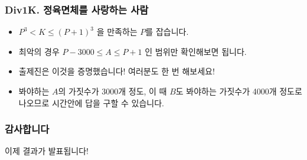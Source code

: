 \documentclass[xetex]{beamer}
\begin{document}
\begin{frame}
  \frametitle{Div1K. 정육면체를 사랑하는 사람}
  \begin{itemize}
    \item $P^3 < K \le (P+1)^3$  을 만족하는 $P$를 잡습니다.
    \item 최악의 경우 $P - 3000 \le A \le P+1$ 인 범위만 확인해보면 됩니다.
    \item 출제진은 이것을 증명했습니다! 여러분도 한 번 해보세요!
    \item 봐야하는 $A$의 가짓수가 3000개 정도, 이 때 $B$도 봐야하는 가짓수가 4000개 정도로 나오므로 시간안에 답을 구할 수 있습니다.
  \end{itemize}
\end{frame}

\begin{frame}
  \frametitle{감사합니다}
  \begin{center}
    이제 결과가 발표됩니다!
  \end{center}
\end{frame}
\end{document}
